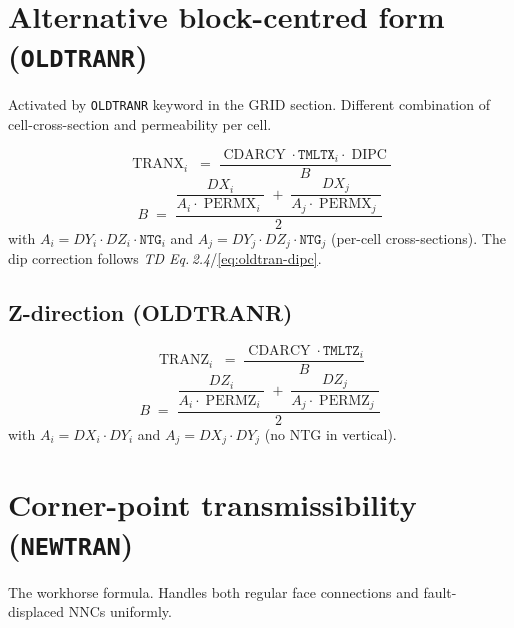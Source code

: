 \documentclass[11pt,a4paper]{article}
\newcommand{\TDref}[1]{\textit{TD Eq.\,#1}}
\newcommand{\kw}[1]{\texttt{#1}}
\DeclareMathOperator{\CDARCY}{CDARCY}
\DeclareMathOperator{\TRANX}{TRANX}
\DeclareMathOperator{\TRANZ}{TRANZ}
\DeclareMathOperator{\DIPC}{DIPC}
\DeclareMathOperator{\PERMX}{PERMX}
\DeclareMathOperator{\PERMZ}{PERMZ}
\begin{document}
\section{Alternative block-centred form (\kw{OLDTRANR})}

Activated by \kw{OLDTRANR} keyword in the GRID section. Different combination of cell-cross-section
and permeability per cell.

\begin{equation}
\TRANX_i \;=\; \frac{\CDARCY \cdot \kw{TMLTX}_i \cdot \DIPC}{B}
\label{eq:oldtranr-x}
\tag{TD 2.8}
\end{equation}
\begin{equation}
B \;=\; \frac{\dfrac{DX_i}{A_i \cdot \PERMX_i} \;+\; \dfrac{DX_j}{A_j \cdot \PERMX_j}}{2}
\label{eq:oldtranr-B}
\tag{TD 2.9}
\end{equation}
with $A_i = DY_i \cdot DZ_i \cdot \kw{NTG}_i$ and $A_j = DY_j \cdot DZ_j \cdot \kw{NTG}_j$
(per-cell cross-sections).
The dip correction follows \TDref{2.4}/\eqref{eq:oldtran-dipc}.

\subsection*{Z-direction (OLDTRANR)}
\begin{equation}
\TRANZ_i \;=\; \frac{\CDARCY \cdot \kw{TMLTZ}_i}{B}
\label{eq:oldtranr-z}
\tag{TD 2.11}
\end{equation}
\begin{equation}
B \;=\; \frac{\dfrac{DZ_i}{A_i \cdot \PERMZ_i} \;+\; \dfrac{DZ_j}{A_j \cdot \PERMZ_j}}{2}
\label{eq:oldtranr-Bz}
\tag{TD 2.12}
\end{equation}
with $A_i = DX_i \cdot DY_i$ and $A_j = DX_j \cdot DY_j$ (no NTG in vertical).

\section{Corner-point transmissibility (\kw{NEWTRAN})}

The workhorse formula. Handles both regular face connections and fault-displaced
NNCs uniformly.
\end{document}
